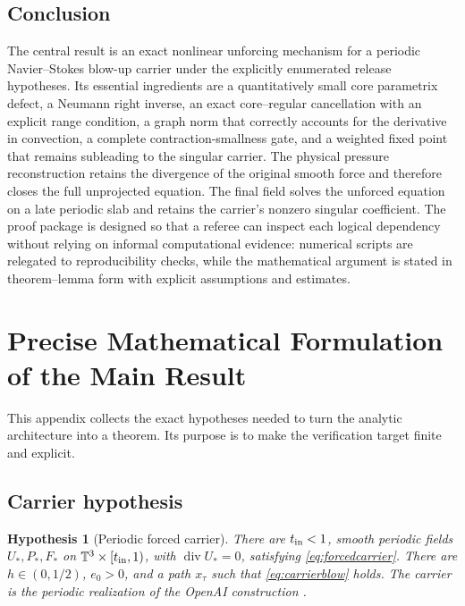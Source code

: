 \documentclass[11pt]{article}
\newtheorem{hypothesis}[theorem]{Hypothesis}
\numberwithin{equation}{section}
\newcommand{\T}{\mathbb T^3}
\newcommand{\diver}{\operatorname{div}}
\begin{document}
\subsection{Conclusion}
The central result is an exact nonlinear unforcing mechanism for a periodic Navier--Stokes blow-up carrier under the explicitly enumerated release hypotheses.  Its essential ingredients are a quantitatively small core parametrix defect, a Neumann right inverse, an exact core--regular cancellation with an explicit range condition, a graph norm that correctly accounts for the derivative in convection, a complete contraction-smallness gate, and a weighted fixed point that remains subleading to the singular carrier.  The physical pressure reconstruction retains the divergence of the original smooth force and therefore closes the full unprojected equation.  The final field solves the unforced equation on a late periodic slab and retains the carrier's nonzero singular coefficient.  The proof package is designed so that a referee can inspect each logical dependency without relying on informal computational evidence: numerical scripts are relegated to reproducibility checks, while the mathematical argument is stated in theorem--lemma form with explicit assumptions and estimates.

\appendix

\section{Precise Mathematical Formulation of the Main Result}\label{app:precise}

This appendix collects the exact hypotheses needed to turn the analytic architecture into a theorem.  Its purpose is to make the verification target finite and explicit.

\subsection{Carrier hypothesis}
\begin{hypothesis}[Periodic forced carrier]\label{hyp:carrier}
There are \(t_{\rm in}<1\), smooth periodic fields \(U_*,P_*,F_*\) on \(\T\times[t_{\rm in},1)\), with \(\diver U_*=0\), satisfying \eqref{eq:forcedcarrier}.  There are \(h\in(0,1/2)\), \(e_0>0\), and a path \(x_\tau\) such that \eqref{eq:carrierblow} holds.  The carrier is the periodic realization of the OpenAI construction \cite{OpenAI2026NS,OpenAIRepo2026}.
\end{hypothesis}
\end{document}
